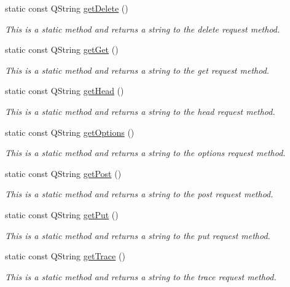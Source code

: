 \begin{DoxyCompactItemize}
\item 
static const Q\+String \hyperlink{class_c_w_f_1_1_http_request_method_ad63561f9453c2362e1758ceb964accd6}{get\+Delete} ()
\begin{DoxyCompactList}\small\item\em This is a static method and returns a string to the delete request method. \end{DoxyCompactList}\item 
static const Q\+String \hyperlink{class_c_w_f_1_1_http_request_method_ad6e58fa2e06927cb4ce3ff19c3f4369f}{get\+Get} ()
\begin{DoxyCompactList}\small\item\em This is a static method and returns a string to the get request method. \end{DoxyCompactList}\item 
static const Q\+String \hyperlink{class_c_w_f_1_1_http_request_method_adc2dd58856fc6aca290e039589f2c6d7}{get\+Head} ()
\begin{DoxyCompactList}\small\item\em This is a static method and returns a string to the head request method. \end{DoxyCompactList}\item 
static const Q\+String \hyperlink{class_c_w_f_1_1_http_request_method_a682a34e04ff2fcc5ff71d1e35ea296e2}{get\+Options} ()
\begin{DoxyCompactList}\small\item\em This is a static method and returns a string to the options request method. \end{DoxyCompactList}\item 
static const Q\+String \hyperlink{class_c_w_f_1_1_http_request_method_a29593550f01b15a1b67c627e75b9a14a}{get\+Post} ()
\begin{DoxyCompactList}\small\item\em This is a static method and returns a string to the post request method. \end{DoxyCompactList}\item 
static const Q\+String \hyperlink{class_c_w_f_1_1_http_request_method_a11a56340e3b597802c7166a1083a4ea6}{get\+Put} ()
\begin{DoxyCompactList}\small\item\em This is a static method and returns a string to the put request method. \end{DoxyCompactList}\item 
static const Q\+String \hyperlink{class_c_w_f_1_1_http_request_method_a581cae139792fb05da6cb5fcbdc7d8f7}{get\+Trace} ()
\begin{DoxyCompactList}\small\item\em This is a static method and returns a string to the trace request method. \end{DoxyCompactList}\end{DoxyCompactItemize}


